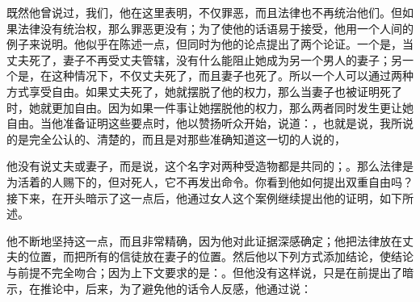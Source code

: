 \newline{}\par

既然他曾说过，我们，他在这里表明，不仅罪恶，而且法律也不再统治他们。但如果法律没有统治权，那么罪恶更没有；为了使他的话语易于接受，他用一个人间的例子来说明。他似乎在陈述一点，但同时为他的论点提出了两个论证。一个是，当丈夫死了，妻子不再受丈夫管辖，没有什么能阻止她成为另一个男人的妻子；另一个是，在这种情况下，不仅丈夫死了，而且妻子也死了。所以一个人可以通过两种方式享受自由。如果丈夫死了，她就摆脱了他的权力，那么当妻子也被证明死了时，她就更加自由。因为如果一件事让她摆脱他的权力，那么两者同时发生更让她自由。当他准备证明这些要点时，他以赞扬听众开始，说道：，也就是说，我所说的是完全公认的、清楚的，而且是对那些准确知道这一切的人说的，\newline{}\par

\newline{}\par

他没有说丈夫或妻子，而是说，这个名字对两种受造物都是共同的；。那么法律是为活着的人赐下的，但对死人，它不再发出命令。你看到他如何提出双重自由吗？接下来，在开头暗示了这一点后，他通过女人这个案例继续提出他的证明，如下所述。\newline{}\par

\newline{}\par

他不断地坚持这一点，而且非常精确，因为他对此证据深感确定；他把法律放在丈夫的位置，而把所有的信徒放在妻子的位置。然后他以下列方式添加结论，使结论与前提不完全吻合；因为上下文要求的是：。但他没有这样说，只是在前提出了暗示，在推论中，后来，为了避免他的话令人反感，他通过说：\newline{}\par

\newline{}\par

